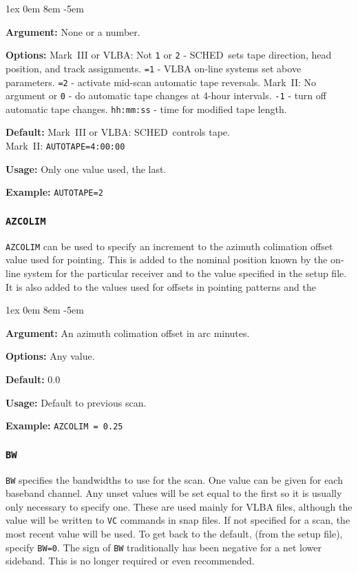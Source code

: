 \documentclass{report}
\newcommand{\schedb}{{\sc SCHED~}}
\newcommand{\rcwbox}[5]{
  \begin{list}{}{\parsep 1ex  \itemsep 0em
                 \leftmargin 8em  \itemindent -5em }
    \item {\bf Argument:} #1
    \item {\bf Options:}  #2
    \item {\bf Default:}  #3
    \item {\bf Usage:}    #4
    \item {\bf Example:}  #5
  \end{list}
}
\begin{document}
\rcwbox
{None or a number.}
{Mark~III or VLBA: Not {\tt 1} or {\tt 2} - \schedb sets tape
direction, head position, and track assignments. {\tt =1} - VLBA
on-line systems set above parameters. {\tt =2} - activate mid-scan
automatic tape reversals. Mark~II: No argument or {\tt 0} - do
automatic tape changes at 4-hour intervals. {\tt -1} - turn off
automatic tape changes. {\tt hh:mm:ss} - time for modified tape
length.}
{Mark~III or VLBA: \schedb controls tape. \\
Mark~II: {\tt AUTOTAPE=4:00:00}}
{Only one value used, the last.}
{{\tt AUTOTAPE=2}}



\subsubsection{\label{MP:AZCOLIM}\tt AZCOLIM}

{\tt AZCOLIM} can be used to specify an
increment to the azimuth colimation offset value used for pointing.
This is added to the nominal position known by the on-line system
for the particular receiver and to the value specified in the setup
file.  It is also added to the values used for offsets in pointing
patterns and the 

\rcwbox
{An azimuth colimation offset in arc minutes.}
{Any value.}
{0.0}
{Default to previous scan.}
{{\tt AZCOLIM = 0.25 }}



\subsubsection{\label{MP:BW}{\tt BW}}

{\tt BW} specifies the bandwidths to use for the scan.  One value can
be given for each baseband channel.  Any unset values will be set
equal to the first so it is usually only necessary to specify one.
These are used mainly for VLBA files, although the value will be
written to {\tt VC} commands in snap files. If not specified for a
scan, the most recent value will be used. To get back to the default,
(from the setup file), specify {\tt BW=0}.  The sign of {\tt BW}
traditionally has been negative for a net lower sideband.  This
is no longer required or even recommended.

\end{document}
